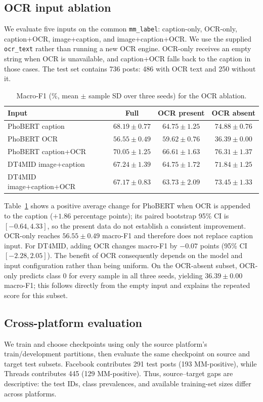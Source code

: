 \documentclass[conference]{IEEEtran}
\begin{document}
\subsection{OCR input ablation}
\label{sec:ocr-ablation}
We evaluate five inputs on the common \texttt{mm\_label}: caption-only, OCR-only, caption+OCR, image+caption, and image+caption+OCR. We use the supplied \texttt{ocr\_text} rather than running a new OCR engine. OCR-only receives an empty string when OCR is unavailable, and caption+OCR falls back to the caption in those cases. The test set contains 736 posts: 486 with OCR text and 250 without it.

\begin{table}[t]
\centering
\scriptsize
\setlength{\tabcolsep}{2.5pt}
\begin{tabular}{lccc}
\toprule
\textbf{Input} & \textbf{Full} & \textbf{OCR present} & \textbf{OCR absent} \\
\midrule
PhoBERT caption & $68.19\pm0.77$ & $64.75\pm1.25$ & $74.88\pm0.76$ \\
PhoBERT OCR & $56.55\pm0.49$ & $59.62\pm0.76$ & $36.39\pm0.00$ \\
PhoBERT caption+OCR & $70.05\pm1.25$ & $66.61\pm1.63$ & $76.31\pm1.37$ \\
DT4MID image+caption & $67.24\pm1.39$ & $64.75\pm1.72$ & $71.84\pm1.25$ \\
DT4MID image+caption+OCR & $67.17\pm0.83$ & $63.73\pm2.09$ & $73.45\pm1.33$ \\
\bottomrule
\end{tabular}
\caption{Macro-F1 (\%, mean $\pm$ sample SD over three seeds) for the OCR ablation.}
\label{tab:ocr-results}
\end{table}

Table~\ref{tab:ocr-results} shows a positive average change for PhoBERT when OCR is appended to the caption ($+1.86$ percentage points); its paired bootstrap 95\% CI is $[-0.64,4.33]$, so the present data do not establish a consistent improvement. OCR-only reaches $56.55\pm0.49$ macro-F1 and therefore does not replace caption input. For DT4MID, adding OCR changes macro-F1 by $-0.07$ points (95\% CI $[-2.28,2.05]$). The benefit of OCR consequently depends on the model and input configuration rather than being uniform. On the OCR-absent subset, OCR-only predicts class 0 for every sample in all three seeds, yielding $36.39\pm0.00$ macro-F1; this follows directly from the empty input and explains the repeated score for this subset.

\subsection{Cross-platform evaluation}
\label{sec:cross-platform}
We train and choose checkpoints using only the source platform's train/development partitions, then evaluate the same checkpoint on source and target test subsets. Facebook contributes 291 test posts (193 MM-positive), while Threads contributes 445 (129 MM-positive). Thus, source--target gaps are descriptive: the test IDs, class prevalences, and available training-set sizes differ across platforms.
\end{document}
